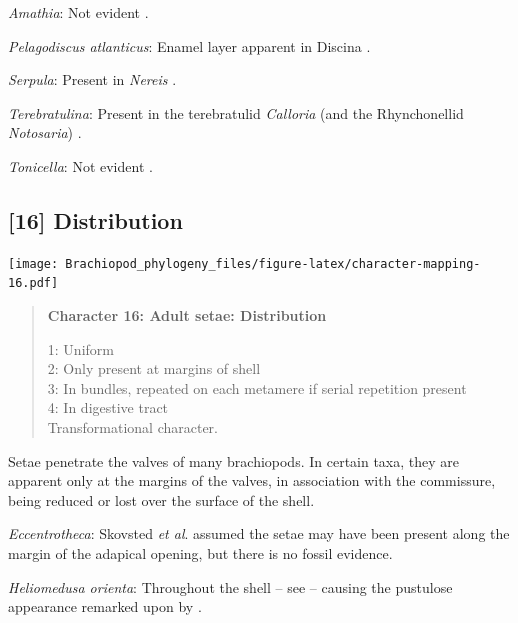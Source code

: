 \documentclass[openany]{book}
\begin{document}
\hypertarget{Amathia-coding-15}{}
\emph{Amathia}: Not evident \citep{Gordon1975}.

\hypertarget{Pelagodiscus_atlanticus-coding-15}{}
\emph{Pelagodiscus atlanticus}: Enamel layer apparent in Discina
\citep[fig. 47.1]{Williams1997Introduction}.

\hypertarget{Serpula-coding-15}{}
\emph{Serpula}: Present in \emph{Nereis} \citep{Gustus1973}.

\hypertarget{Terebratulina-coding-15}{}
\emph{Terebratulina}: Present in the terebratulid \emph{Calloria} (and
the Rhynchonellid \emph{Notosaria}) \citep{Luter2000}.

\hypertarget{Tonicella-coding-15}{}
\emph{Tonicella}: Not evident \citep{Leise1988, Fischer1980}.

\subsection*{{[}16{]} Distribution}\label{distribution}

\texttt{[image: Brachiopod\_phylogeny\_files/figure-latex/character-mapping-16.pdf]}

\begin{quote}
\textbf{Character 16: Adult setae: Distribution}

1: Uniform\\
2: Only present at margins of shell\\
3: In bundles, repeated on each metamere if serial repetition present\\
4: In digestive tract\\
Transformational character.
\end{quote}

Setae penetrate the valves of many brachiopods. In certain taxa, they
are apparent only at the margins of the valves, in association with the
commissure, being reduced or lost over the surface of the shell.

\hypertarget{Eccentrotheca-coding-16}{}
\emph{Eccentrotheca}: Skovsted \emph{et al}.
\citeyearpar{Skovsted2011Scleritomeconstruction} assumed the setae may
have been present along the margin of the adapical opening, but there is
no fossil evidence.

\hypertarget{Heliomedusa_orienta-coding-16}{}
\emph{Heliomedusa orienta}: Throughout the shell -- see
\citet{Williams2007Supplement} -- causing the pustulose appearance
remarked upon by \citet{Chen2007Reinterpretationof}.
\end{document}
